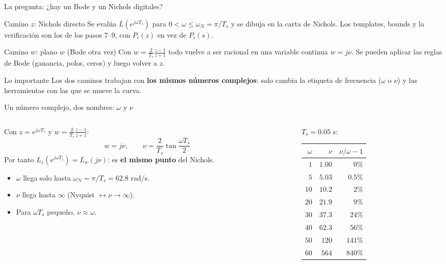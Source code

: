 \documentclass[aspectratio=169,11pt]{beamer}
\begin{document}
\begin{frame}{La pregunta: ¿hay un Bode y un Nichols digitales?}
  \small
  \begin{block}{Camino $z$: Nichols directo}
    Se evalúa $L(e^{j\omega T_s})$ para $0<\omega\le\omega_N=\pi/T_s$ y se dibuja en la carta de Nichols. Los templates, bounds y la verificación son los de los pasos 7--9, con $P_i(z)$ en vez de $P_i(s)$.
  \end{block}
  \begin{block}{Camino $w$: plano $w$ (Bode otra vez)}
    Con $w=\frac{2}{T_s}\frac{z-1}{z+1}$ todo vuelve a ser racional en una variable continua $w=j\nu$. Se pueden aplicar las reglas de Bode (ganancia, polos, ceros) y luego volver a $z$.
  \end{block}
  \begin{alertblock}{Lo importante}
    Los dos caminos trabajan con \textbf{los mismos números complejos}: solo cambia la etiqueta de frecuencia ($\omega$ o $\nu$) y las herramientas con las que se mueve la curva.
  \end{alertblock}
\end{frame}

\begin{frame}{Un número complejo, dos nombres: $\omega$ y $\nu$}
  \footnotesize
  \begin{columns}[T]
  \begin{column}{0.5\textwidth}
    Con $z=e^{j\omega T_s}$ y $w=\frac{2}{T_s}\frac{z-1}{z+1}$:
    \[ w=j\nu,\qquad \nu=\frac{2}{T_s}\tan\frac{\omega T_s}{2} \]
    Por tanto $L_z(e^{j\omega T_s})=L_w(j\nu)$: es \textbf{el mismo punto} del Nichols.
    \begin{itemize}
      \item $\omega$ llega solo hasta $\omega_N=\pi/T_s=62.8$ rad/s.
      \item $\nu$ llega hasta $\infty$ (Nyquist $\leftrightarrow\nu\to\infty$).
      \item Para $\omega T_s$ pequeño, $\nu\approx\omega$.
    \end{itemize}
  \end{column}
  \begin{column}{0.46\textwidth}
    $T_s=0.05$ s:
    \begin{center}
    \begin{tabular}{r|r|r}
      $\omega$ & $\nu$ & $\nu/\omega-1$\\\hline
      $1$ & $1.00$ & $0\%$\\
      $5$ & $5.03$ & $0.5\%$\\
      $10$ & $10.2$ & $2\%$\\
      $20$ & $21.9$ & $9\%$\\
      $30$ & $37.3$ & $24\%$\\
      $40$ & $62.3$ & $56\%$\\
      $50$ & $120$ & $141\%$\\
      $60$ & $564$ & $840\%$
    \end{tabular}
    \end{center}
  \end{column}
  \end{columns}
\end{frame}
\end{document}
